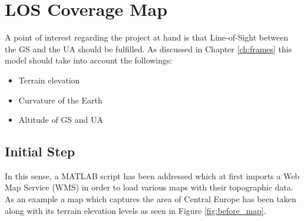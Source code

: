 \section{LOS Coverage Map}\label{sec:los_map}
A point of interest regarding the project at hand is that Line-of-Sight between the GS and the UA should be fulfilled. As discussed in Chapter \ref{ch:frames} this model should take into account the followings:

\begin{itemize}
	\item Terrain elevation
	\item Curvature of the Earth
	\item Altitude of GS and UA
\end{itemize}

\subsection{Initial Step}
In this sense, a MATLAB script has been addressed which at first imports a Web Map Service (WMS) in order to load various maps with their topographic data. As an example a map which captures the area of Central Europe has been taken along with its terrain elevation levels as seen in Figure \ref{fig:before_map}.

